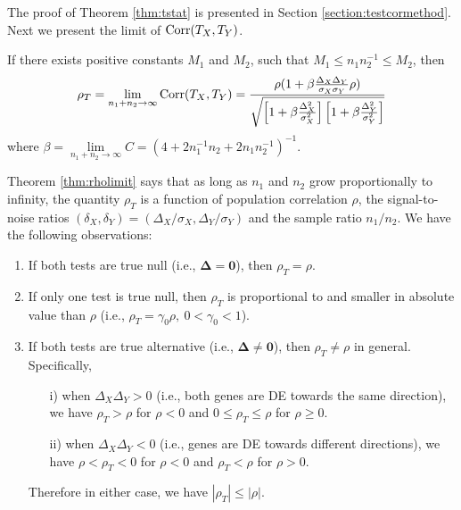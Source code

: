 	The proof of Theorem \ref{thm:tstat} is presented in Section \ref{section:testcormethod}. Next 
	we present the limit of $\text{Corr}(T_X, T_Y)$.
	\begin{theorem}\label{thm:rholimit}
		If there exists positive constants $M_1$ and $M_2$, such that $M_1 \leq n_1n_2^{-1}\leq 
		M_2$, then
		\begin{equation}\label{eq:limitT}
		\rho_T=\lim\limits_{n_1 + n_2 \rightarrow \infty} \text{Corr}(T_X, T_Y) = \frac{\rho(1  +
			\beta\frac{\Delta_X\Delta_Y}{\sigma_X\sigma_Y}\rho)}{\sqrt{  \left[ 1 
			+\beta\frac{\Delta_X^2}{\sigma_X^2}\right]\left[ 1 + 
			\beta\frac{\Delta_Y^2}{\sigma_Y^2}\right]}}
		\end{equation}
		where %
		$\beta = \lim\limits_{n_1 + n_2 \rightarrow \infty}C = (4 + 2n_1^{-1}n_2 + 
		2n_1n_2^{-1})^{-1}$.
	\end{theorem}
	Theorem \ref{thm:rholimit} says that as long as $n_1$ and $n_2$ grow proportionally to 
	infinity, the quantity $\rho_T$ is a function of population correlation $\rho$, the 
	signal-to-noise ratios $(\delta_X, \delta_Y) = (\Delta_X/\sigma_X, \Delta_Y/\sigma_Y)$  and the 
	sample ratio $n_1/n_2$. 
	We have the following observations:
	\begin{enumerate}
		\item If both tests are true null (i.e., $\bm \Delta = \bm 0$), then $\rho_T = \rho$.
		\item If only one test is true null, then $\rho_T$ is proportional to and smaller in 
		absolute value than $\rho$ (i.e., $\rho_T = \gamma_0\rho,~ 0 <\gamma_0 <1$).
		\item If both tests are true alternative (i.e., $\bm \Delta \neq \bm 0$), then $\rho_T\neq 
		\rho$ in general. Specifically,
		\begin{enumerate}
			\item[i)]  when $\Delta_X\Delta_Y >0$ (i.e., both genes are DE towards the same 
			direction), we have $\rho_T>\rho$ for $\rho <0$ and $0 \leq \rho_T \leq\rho$ for $\rho 
			\geq 0$.
			\item[ii)] when $\Delta_X\Delta_Y <0$ (i.e., genes are DE towards different 
			directions), we have
			$\rho <\rho_T<0$ for $\rho <0$ and $\rho_T<\rho$ for $\rho>0$.
		\end{enumerate}
		Therefore in either case, we have $|\rho_T| \leq |\rho|$. 
	\end{enumerate}
	
	
	
	
